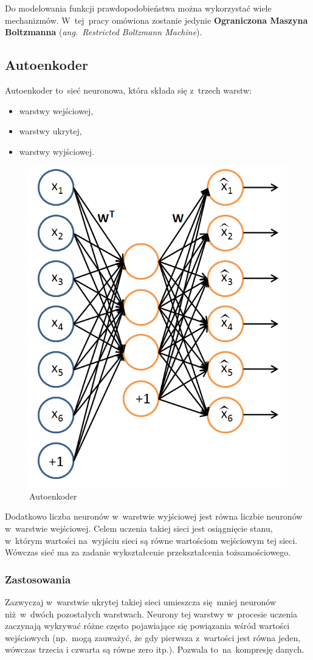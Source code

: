 Do modelowania funkcji prawdopodobieństwa można wykorzystać wiele mechanizmów. W~tej~pracy omówiona zostanie
jedynie \textbf{Ograniczona Maszyna Boltzmanna} (\textit{ang.~Restricted Boltzmann Machine}).

\subsection{Autoenkoder}
Autoenkoder \cite{Autoencoder} to~sieć neuronowa, która składa się z~trzech warstw:
\begin{itemize}
	\item warstwy wejściowej,
	\item warstwy ukrytej,
	\item warstwy wyjściowej.
\end{itemize}

\begin{figure}[H]
	\centering
	\includegraphics[width=0.75\linewidth]{img/autoencoder.png}
	\caption{Autoenkoder}
\end{figure}

Dodatkowo liczba neuronów w~warstwie wyjściowej jest równa liczbie neuronów w~warstwie wejściowej.
Celem uczenia takiej sieci jest osiągnięcie stanu, w~którym wartości na~wyjściu sieci są równe
wartościom wejściowym tej sieci. Wówczas sieć ma za zadanie wykształcenie przekształcenia tożsamościowego.

\subsubsection{Zastosowania}
Zazwyczaj w~warstwie ukrytej takiej sieci umieszcza się~mniej neuronów niż~w~dwóch pozostałych warstwach.
Neurony tej warstwy w~procesie uczenia zaczynają wykrywać różne często pojawiające się powiązania
wśród wartości wejściowych (np.~mogą zauważyć, że gdy pierwsza z~wartości jest równa jeden,
wówczas trzecia i czwarta są równe zero itp.).
Pozwala to~na~kompresję danych.

